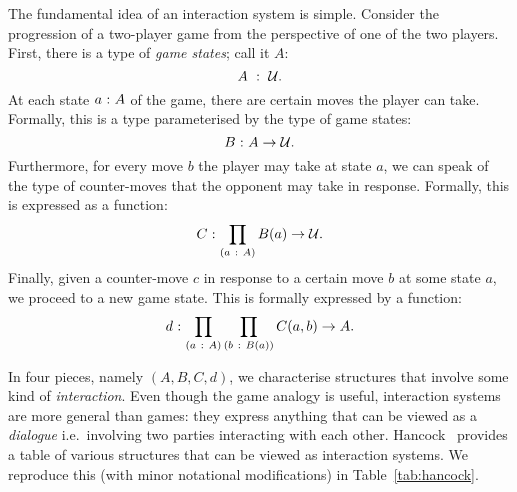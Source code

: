 The fundamental idea of an interaction system is simple. Consider the progression of a
two-player game from the perspective of one of the two players. First, there is a type of
\emph{game states}; call it $A$:
\begin{equation*}
  A~:~\mathcal{U}.
\end{equation*}
At each state $a\hspace{0.1mm}:\hspace{0.1mm}A$ of the game, there are certain moves the player can take.
Formally, this is a type parameterised by the type of game states:
\begin{equation*}
  B\hspace{0.1mm}:\hspace{0.1mm}A \rightarrow \mathcal{U}.
\end{equation*}
Furthermore, for every move $b$ the player may take at state $a$, we can speak of the type
of counter-moves that the opponent may take in response. Formally, this is expressed as
a function:
\begin{equation*}
  C\hspace{0.1mm}:\hspace{0.1mm}\prod_{(a~:~A)} B(a) \rightarrow \mathcal{U}.
\end{equation*}
Finally, given a counter-move $c$ in response to a certain move $b$ at some state $a$, we
proceed to a new game state. This is formally expressed by a function:
\begin{equation*}
  d\hspace{0.1mm}:\hspace{0.1mm}\prod_{(a~:~A)} \prod_{(b~:~B(a))} C(a, b) \rightarrow A.
\end{equation*}

In four pieces, namely $(A, B, C, d)$, we characterise structures that involve some kind
of \emph{interaction}. Even though the game analogy is useful, interaction systems are
more general than games: they express anything that can be viewed as a \emph{dialogue}
i.e.~involving two parties interacting with each other.
Hancock~\cite{hancock-interaction-systems} provides a table of various structures that can
be viewed as interaction systems. We reproduce this (with minor notational modifications)
in Table~\ref{tab:hancock}.

